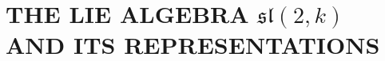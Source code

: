 \section{\texorpdfstring{THE LIE ALGEBRA \(\mathfrak{sl}(2,k)\) AND ITS REPRESENTATIONS}{THE LIE ALGEBRA \textbackslash mathfrak\{sl\}(2,k) AND ITS REPRESENTATIONS}}

